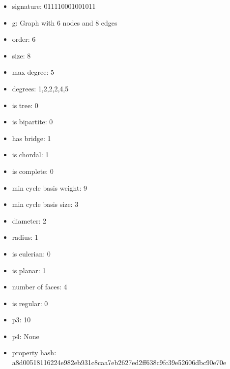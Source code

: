 \begin{itemize}
\item signature: 011110001001011
\item g: Graph with 6 nodes and 8 edges
\item order: 6
\item size: 8
\item max degree: 5
\item degrees: 1,2,2,2,4,5
\item is tree: 0
\item is bipartite: 0
\item has bridge: 1
\item is chordal: 1
\item is complete: 0
\item min cycle basis weight: 9
\item min cycle basis size: 3
\item diameter: 2
\item radius: 1
\item is eulerian: 0
\item is planar: 1
\item number of faces: 4
\item is regular: 0
\item p3: 10
\item p4: None
\item property hash: a8d00518116224e982eb931c8caa7eb2627ed2ff638c9fc39e52606dbc90e70e
\end{itemize}
\newpage
\begin{figure}
\end{figure}
